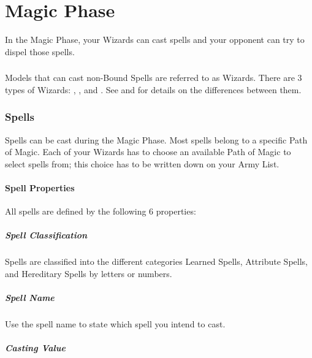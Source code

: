 
\part{Magic Phase}
\label{magic_phase}

In the Magic Phase, your Wizards can cast spells and your opponent can try to dispel those spells.

\section{\wizards}
\label{wizards}

Models that can cast non-Bound Spells are referred to as Wizards. There are 3 types of Wizards: \wizardapprentices{}, \wizardadepts{}, and \wizardmasters{}. See  and  for details on the differences between them.

\section{Spells}
\label{spells}

Spells can be cast during the Magic Phase. Most spells belong to a specific Path of Magic. Each of your Wizards has to choose an available Path of Magic to select spells from; this choice has to be written down on your Army List.

\subsection{Spell Properties}
\label{spell_properties}

All spells are defined by the following 6 properties:

\subsubsection{Spell Classification}

Spells are classified into the different categories Learned Spells, Attribute Spells, and Hereditary Spells by letters or numbers.

\subsubsection{Spell Name} 

Use the spell name to state which spell you intend to cast.

\subsubsection{Casting Value} 

